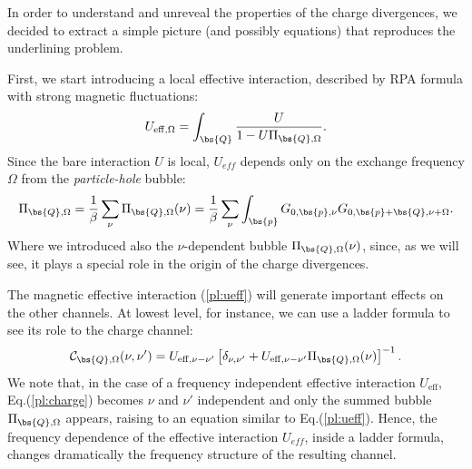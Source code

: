 In order to understand and unreveal the properties of the charge divergences, we decided to 
extract a simple picture (and possibly equations) that reproduces the 
underlining problem. 

First, we start introducing a local effective interaction, described by RPA formula
with strong magnetic fluctuations:
\begin{equation}
	U_{\mathrm{eff},\Omega} = \int_{\bs{Q}} \frac{U}{1- U \Pi_{\bs{Q},\Omega}}.
\label{pl:ueff}
\end{equation}
Since the bare interaction $U$ is local, $U_{eff}$ depends only on the exchange 
frequency $\Omega$ from the \textit{particle-hole} bubble:
\begin{equation}
	\Pi_{\bs{Q},\Omega} = \frac{1}{\beta} \sum_{\nu} \Pi_{\bs{Q},\Omega}(\nu) 
	= \frac{1}{\beta} \sum_{\nu} \int_{\bs{p}} G_{0,\bs{p},\nu} G_{0,\bs{p}+\bs{Q},\nu+\Omega}.
\end{equation}
Where we introduced also the $\nu$-dependent bubble $\Pi_{\bs{Q},\Omega}(\nu)$, since, as we will 
see, it plays a special role in the origin of the charge divergences.

The magnetic effective interaction (\ref{pl:ueff}) will generate important effects on the other channels. 
At lowest level, for instance, we can use a ladder formula to see its role to the charge channel:
\begin{equation}
	\mathcal{C}_{\bs{Q},\Omega} (\nu,\nu') = U_{\mathrm{eff},\nu-\nu'} \left[ \delta_{\nu,\nu'} + U_{\mathrm{eff},\nu-\nu'}\Pi_{\bs{Q},\Omega}(\nu) \right]^{-1}.
\label{pl:charge}
\end{equation}
We note that, in the case of a frequency independent effective interaction $U_{\mathrm{eff}}$, Eq.(\ref{pl:charge}) becomes $\nu$ and $\nu'$ independent 
and only the summed bubble $\Pi_{\bs{Q},\Omega}$ appears, raising to an equation similar to Eq.(\ref{pl:ueff}).
Hence, the frequency dependence of the effective interaction $U_{eff}$, inside a ladder formula, changes dramatically the frequency structure of the 
resulting channel. 

